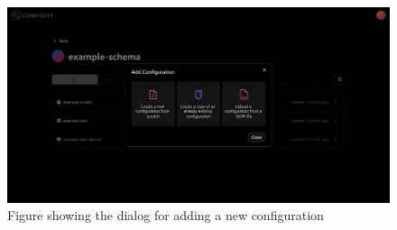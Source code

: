 \begin{figure}[!ht]
   \begin{minipage}{1\textwidth}
     \centering
     \includegraphics[width=.85\textwidth]{Figures/configurations-page/add-config.pdf}
     \caption[Add configuration dialog]{Figure showing the dialog for adding a new configuration}
     \label{adding:configuration-start}
   \end{minipage}\hfill
\end{figure}

